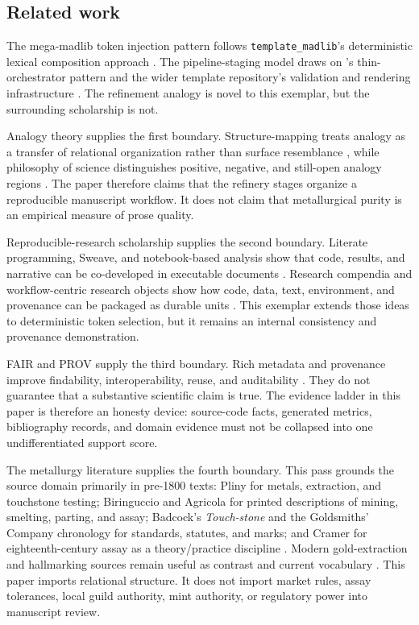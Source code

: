 \documentclass[
]{article}
\begin{document}
\subsection{Related work}\label{related-work}

The mega-madlib token injection pattern follows
\texttt{template\_madlib}'s deterministic lexical composition approach
\citep{template_madlib}. The pipeline-staging model draws on
's thin-orchestrator pattern and the
wider template repository's validation and rendering infrastructure
\citep{template_repo}. The refinement analogy is novel to this exemplar,
but the surrounding scholarship is not.

Analogy theory supplies the first boundary. Structure-mapping treats
analogy as a transfer of relational organization rather than surface
resemblance \citep{gentner1983structure}, while philosophy of science
distinguishes positive, negative, and still-open analogy regions
\citep{hesse1966models}. The paper therefore claims that the refinery
stages organize a reproducible manuscript workflow. It does not claim
that metallurgical purity is an empirical measure of prose quality.

Reproducible-research scholarship supplies the second boundary. Literate
programming, Sweave, and notebook-based analysis show that code,
results, and narrative can be co-developed in executable documents
\citep{knuth1984literate, leisch2002sweave, rule2019jupyter}. Research
compendia and workflow-centric research objects show how code, data,
text, environment, and provenance can be packaged as durable units
\citep{marwick2018packaging, belhajjame2015ontologies}. This exemplar
extends those ideas to deterministic token selection, but it remains an
internal consistency and provenance demonstration.

FAIR and PROV supply the third boundary. Rich metadata and provenance
improve findability, interoperability, reuse, and auditability
\citep{wilkinson2016fair, moreau2013prov}. They do not guarantee that a
substantive scientific claim is true. The evidence ladder in this paper
is therefore an honesty device: source-code facts, generated metrics,
bibliography records, and domain evidence must not be collapsed into one
undifferentiated support score.

The metallurgy literature supplies the fourth boundary. This pass
grounds the source domain primarily in pre-1800 texts: Pliny for metals,
extraction, and touchstone testing; Biringuccio and Agricola for printed
descriptions of mining, smelting, parting, and assay; Badcock's
\emph{Touch-stone} and the Goldsmiths' Company chronology for standards,
statutes, and marks; and Cramer for eighteenth-century assay as a
theory/practice discipline
\citep{pliny_natural_history_33, biringuccio_pirotechnia_1540, agricola_de_re_metallica_1556, badcock_touchstone_1678, goldsmiths_hallmarking_history, cramer_assaying_metals_1741}.
Modern gold-extraction and hallmarking sources remain useful as contrast
and current vocabulary
\citep{marsden_house_2006, hallmarking_convention_1972, lbma_good_delivery_rules}.
This paper imports relational structure. It does not import market
rules, assay tolerances, local guild authority, mint authority, or
regulatory power into manuscript review.
\end{document}

